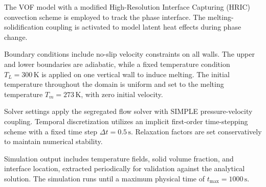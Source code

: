 The VOF model with a modified High-Resolution Interface Capturing (HRIC) 
convection scheme is employed to track the phase interface. The melting-solidification coupling 
is activated to model latent heat effects during phase change.

Boundary conditions include no-slip velocity constraints on all walls. The upper and 
lower boundaries are adiabatic, while a fixed temperature condition \(T_L = 300\,\si{\kelvin}\) is 
applied on one vertical wall to induce melting. The initial temperature throughout the domain 
is uniform and set to the melting temperature \(T_m = 273\,\si{\kelvin}\), with zero initial velocity.

Solver settings apply the segregated flow solver with SIMPLE pressure-velocity coupling. 
Temporal discretization utilizes an implicit first-order time-stepping scheme with a 
fixed time step \(\Delta t = 0.5\,\si{\second}\). Relaxation factors are set conservatively 
to maintain numerical stability.

Simulation output includes temperature fields, solid volume fraction, and interface location,
 extracted periodically for validation against the analytical solution. The simulation 
 runs until a maximum physical time of \(t_{\mathrm{max}} = 1000\,\si{\second}\).

